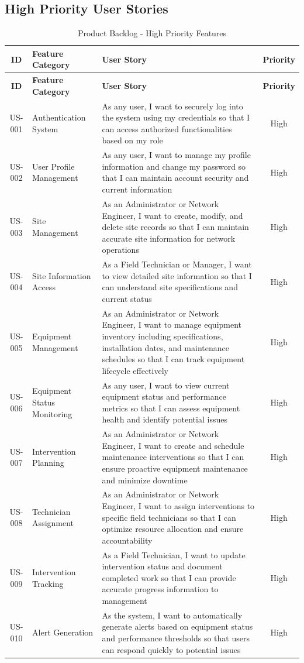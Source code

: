\subsection{High Priority User Stories}

\begin{longtable}{|c|p{3.5cm}|p{7.5cm}|c|}
\caption{Product Backlog - High Priority Features} \\
\hline
\textbf{ID} & \textbf{Feature Category} & \textbf{User Story} & \textbf{Priority} \\
\hline
\endfirsthead
\hline
\textbf{ID} & \textbf{Feature Category} & \textbf{User Story} & \textbf{Priority} \\
\hline
\endhead
US-001 & Authentication System & As any user, I want to securely log into the system using my credentials so that I can access authorized functionalities based on my role & High \\
\hline
US-002 & User Profile Management & As any user, I want to manage my profile information and change my password so that I can maintain account security and current information & High \\
\hline
US-003 & Site Management & As an Administrator or Network Engineer, I want to create, modify, and delete site records so that I can maintain accurate site information for network operations & High \\
\hline
US-004 & Site Information Access & As a Field Technician or Manager, I want to view detailed site information so that I can understand site specifications and current status & High \\
\hline
US-005 & Equipment Management & As an Administrator or Network Engineer, I want to manage equipment inventory including specifications, installation dates, and maintenance schedules so that I can track equipment lifecycle effectively & High \\
\hline
US-006 & Equipment Status Monitoring & As any user, I want to view current equipment status and performance metrics so that I can assess equipment health and identify potential issues & High \\
\hline
US-007 & Intervention Planning & As an Administrator or Network Engineer, I want to create and schedule maintenance interventions so that I can ensure proactive equipment maintenance and minimize downtime & High \\
\hline
US-008 & Technician Assignment & As an Administrator or Network Engineer, I want to assign interventions to specific field technicians so that I can optimize resource allocation and ensure accountability & High \\
\hline
US-009 & Intervention Tracking & As a Field Technician, I want to update intervention status and document completed work so that I can provide accurate progress information to management & High \\
\hline
US-010 & Alert Generation & As the system, I want to automatically generate alerts based on equipment status and performance thresholds so that users can respond quickly to potential issues & High \\
\hline
\end{longtable}

